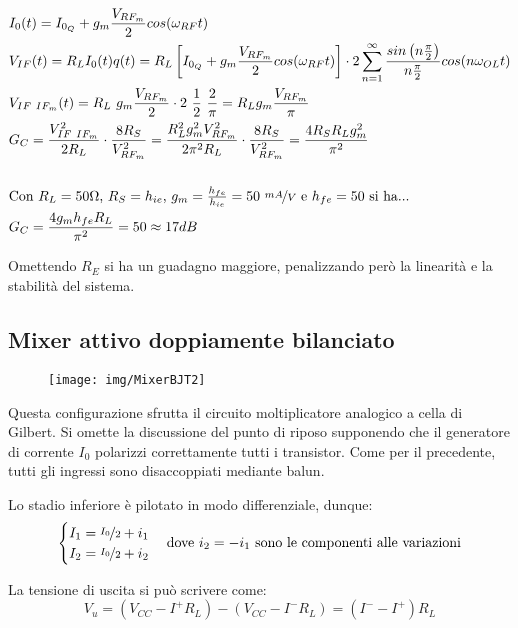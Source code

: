 \begin{align*}
&I_0(t) = I_{0_Q} + g_m \frac{V_{RF_m}}{2} cos(\omega_{RF}t)\\
&V_{IF}(t) = R_L I_0(t) q(t) = R_L \left[ {I_{0_Q}} + g_m \frac{V_{RF_m}}{2} cos(\omega_{RF}t) \right] \cdot 2 \sum_{n=1}^{\infty}\frac{sin \left( n \frac{\pi}{2} \right)}{n \frac{\pi}{2}} cos(n \omega_{OL} t)
\\
&V_{IF~IF_m}(t) = R_L~g_m \frac{V_{RF_m}}{2} \cdot 2 ~ \frac{1}{2} ~ \frac{2}{\pi} = R_{L} g_m \frac{V_{RF_m}}{\pi}\\
&G_C = \frac{V_{IF~IF_m}^2}{2R_L}
\cdot \frac{8R_S}{V_{RF_m}^2}
= \frac{R_L^2 g_m^2 V_{RF_m}^2}{2\pi^2 R_L}
\cdot \frac{8R_S}{V_{RF_m}^2}
= \frac{4R_S R_L g_m^2}{\pi^2}
\\\\
& \mbox{Con $R_L= 50\Omega$, $R_S = h_{ie}$, $g_m = \frac{h_{fe}}{h_{ie}}=50~\nicefrac{mA}{V}$ e $h_{fe}=50$ si ha...}
\\
&G_C = \frac{4g_m h_{fe} R_L}{\pi^2} = 50 \approx 17dB
\end{align*}

Omettendo $R_E$ si ha un guadagno maggiore, penalizzando però la linearità e la stabilità del sistema.

\subsection{Mixer attivo doppiamente bilanciato}

\begin{figure}[h!]
	\centering
	\texttt{[image: img/MixerBJT2]}
	\caption{}
	\label{fig:mixer-008}
\end{figure}

Questa configurazione sfrutta il circuito moltiplicatore analogico a cella di Gilbert. Si omette la discussione del punto di riposo supponendo che il generatore di corrente $I_0$ polarizzi correttamente tutti i transistor.
Come per il precedente, tutti gli ingressi sono disaccoppiati mediante balun.

Lo stadio inferiore è pilotato in modo differenziale, dunque:
\[
\begin{cases}
I_1 = \nicefrac{I_0}{2} + i_1\\
I_2 = \nicefrac{I_0}{2} + i_2\\
\end{cases}
\mbox{dove $i_2 = -i_1$ sono le componenti alle variazioni}
\]

La tensione di uscita si può scrivere come:
\[V_u = (V_{CC} - I^+ R_L) - (V_{CC} - I^- R_L) = 
(I^- - I^+) R_L\]

